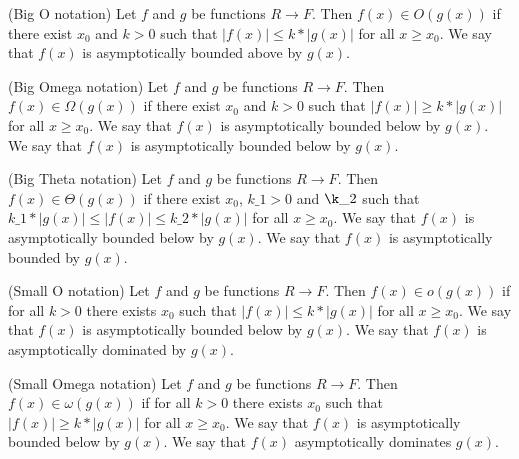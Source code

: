 \begin{definition}(Big O notation)
\leanok
    Let $f$ and $g$ be functions $R \to F$. Then $f(x) \in O(g(x))$ if there exist
    $x_0$ and $k > 0$ such that $|f(x)| \le k*|g(x)|$ for all $x \ge x_0$. We say that
    $f(x)$ is asymptotically bounded above by $g(x)$.
\end{definition}

\begin{definition}(Big Omega notation)
\leanok
    Let $f$ and $g$ be functions $R \to F$. Then $f(x) \in \Omega(g(x))$ if there exist
    $x_0$ and $k > 0$ such that $|f(x)| \ge k*|g(x)|$ for all $x \ge x_0$. We say that
    $f(x)$ is asymptotically bounded below by $g(x)$. We say that $f(x)$ is asymptotically 
    bounded below by $g(x)$.
\end{definition}

\begin{definition}(Big Theta notation)
\leanok
    Let $f$ and $g$ be functions $R \to F$. Then $f(x) \in \Theta(g(x))$ if there exist
    $x_0$, $k\_1 > 0$ and $\k\_2$ such that $k\_1*|g(x)| \le |f(x)| \le k\_2*|g(x)|$ 
    for all $x \ge x_0$. We say that $f(x)$ is asymptotically bounded below by $g(x)$. 
    We say that $f(x)$ is asymptotically bounded by $g(x)$.
\end{definition}

\begin{definition}(Small O notation)
\leanok
    Let $f$ and $g$ be functions $R \to F$. Then $f(x) \in o(g(x))$ if for all
    $k > 0$ there exists $x_0$ such that $|f(x)| \le k*|g(x)|$ for all $x \ge x_0$. 
    We say that $f(x)$ is asymptotically bounded below by $g(x)$. We say that $f(x)$ 
    is asymptotically dominated by $g(x)$.
\end{definition}

\begin{definition}(Small Omega notation)
\leanok
    Let $f$ and $g$ be functions $R \to F$. Then $f(x) \in \omega(g(x))$ if for all
    $k > 0$ there exists $x_0$ such that $|f(x)| \ge k*|g(x)|$ for all $x \ge x_0$. 
    We say that $f(x)$ is asymptotically bounded below by $g(x)$. We say that $f(x)$ 
    asymptotically dominates $g(x)$.
\end{definition}

